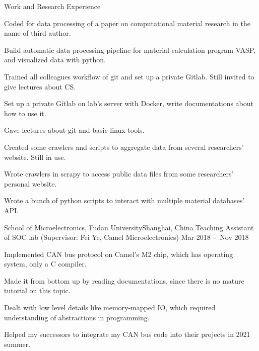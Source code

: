 \documentclass{resume} %
\begin{document}
\begin{rSection}{Work and Research Experience}
\begin{rSubsection}
\item Coded for data processing of a paper on computational material research in the name of third author.
\begin{mySecondItemize}
    \item Build automatic data processing pipeline for material calculation program VASP, and visualized data with python.
\end{mySecondItemize}
\item Trained all colleagues workflow of git and set up a private Gitlab. Still invited to give lectures about CS.
\begin{mySecondItemize}
    \item Set up a private Gitlab on lab's server with Docker, write documentations about how to use it.
    \item Gave lectures about git and basic linux tools.
\end{mySecondItemize}
\item Created some crawlers and scripts to aggregate data from several researchers' website. Still in use.
\begin{mySecondItemize}
    \item Wrote crawlers in scrapy to access public data files from some researchers' personal website.
    \item Wrote a bunch of python scripts to interact with multiple material databases' API. 
\end{mySecondItemize}


\end{rSubsection}



\begin{rSubsection}
{School of Microelectronics, Fudan University}{Shanghai, China}
{Teaching Assistant of SOC lab (Supervisor: Fei Ye, Camel Microelectronics)}
{Mar 2018\ -\ Nov 2018}

\item Implemented CAN bus protocol on Camel's M2 chip, which has operating system, only a C compiler.
\begin{mySecondItemize}
    \item Made it from bottom up by reading documentations, since there is no mature tutorial on this topic.
    \item Dealt with low level details like memory-mapped IO, which required understanding of abstractions in programming.
    \item Helped my successors to integrate my CAN bus code into their projects in 2021 summer.
\end{mySecondItemize}


\end{rSubsection}
\end{rSection}
\end{document}
